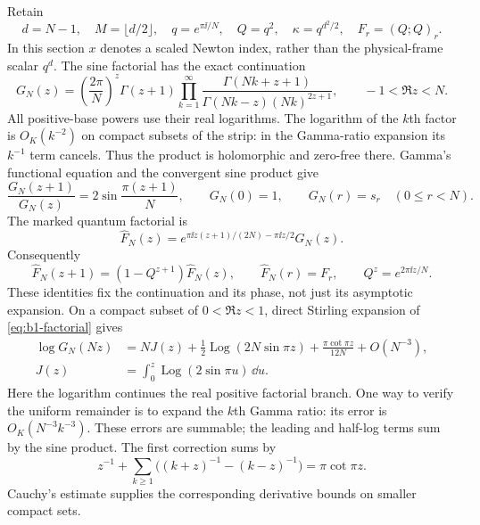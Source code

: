 Retain
\[
 d=N-1,\quad M=\lfloor d/2\rfloor,\quad
 q=e^{\pi\ii/N},\quad Q=q^2,\quad \kappa=q^{d^2/2},\quad
 F_r=(Q;Q)_r.
\]
In this section $x$ denotes a scaled Newton index, rather than the
physical-frame scalar $q^d$. The sine factorial has the exact continuation
\begin{equation}\label{eq:b1-factorial}
 G_N(z)=\left(\frac{2\pi}{N}\right)^z\Gamma(z+1)
 \prod_{k=1}^{\infty}
 \frac{\Gamma(Nk+z+1)}{\Gamma(Nk-z)(Nk)^{2z+1}},
 \qquad -1<\Re z<N.
\end{equation}
All positive-base powers use their real logarithms. The logarithm of the
$k$th factor is $O_K(k^{-2})$ on compact subsets of the strip: in the
Gamma-ratio expansion its $k^{-1}$ term cancels. Thus the product is
holomorphic and zero-free there. Gamma's functional equation and the
convergent sine product give
\begin{equation}\label{eq:b1-factorial-shift}
 \frac{G_N(z+1)}{G_N(z)}=2\sin\frac{\pi(z+1)}N,
 \qquad G_N(0)=1,\qquad G_N(r)=s_r\quad(0\le r<N).
\end{equation}
The marked quantum factorial is
\begin{equation}\label{eq:b1-marked-factorial}
 \widehat F_N(z)=
 e^{\pi\ii z(z+1)/(2N)-\pi\ii z/2}G_N(z).
\end{equation}
Consequently
\[
 \widehat F_N(z+1)=(1-Q^{z+1})\widehat F_N(z),
 \qquad \widehat F_N(r)=F_r,
 \qquad Q^z=e^{2\pi\ii z/N}.
\]
These identities fix the continuation and its phase, not just its
asymptotic expansion. On a compact subset of $0<\Re z<1$, direct
Stirling expansion of \eqref{eq:b1-factorial} gives
\begin{equation}\label{eq:b1-factorial-asymptotic}
 \begin{aligned}
 \log G_N(Nz)
 &=NJ(z)+\frac12\operatorname{Log}(2N\sin\pi z)
   +\frac{\pi\cot\pi z}{12N}+O(N^{-3}),\\
 J(z)&=\int_0^z\operatorname{Log}(2\sin\pi u)\,\dd u.
 \end{aligned}
\end{equation}
Here the logarithm continues the real positive factorial branch. One
way to verify the uniform remainder is to expand the $k$th Gamma ratio:
its error is $O_K(N^{-3}k^{-3})$. These errors are summable; the
leading and half-log terms sum by the sine product. The first correction
sums by
\[
 z^{-1}+\sum_{k\ge1}\bigl((k+z)^{-1}-(k-z)^{-1}\bigr)
 =\pi\cot\pi z.
\]
Cauchy's estimate supplies the corresponding derivative bounds on
smaller compact sets.

